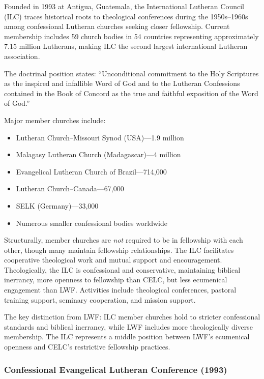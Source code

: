 Founded in 1993 at Antigua, Guatemala, the International Lutheran Council (ILC) traces historical roots to theological conferences during the 1950s--1960s among confessional Lutheran churches seeking closer fellowship. Current membership includes 59 church bodies in 54 countries representing approximately 7.15 million Lutherans, making ILC the second largest international Lutheran association.

The doctrinal position states: ``Unconditional commitment to the Holy Scriptures as the inspired and infallible Word of God and to the Lutheran Confessions contained in the Book of Concord as the true and faithful exposition of the Word of God.''

Major member churches include:

\begin{itemize}
\item Lutheran Church--Missouri Synod (USA)---1.9 million
\item Malagasy Lutheran Church (Madagascar)---4 million
\item Evangelical Lutheran Church of Brazil---714,000
\item Lutheran Church--Canada---67,000
\item SELK (Germany)---33,000
\item Numerous smaller confessional bodies worldwide
\end{itemize}

Structurally, member churches are \textit{not} required to be in fellowship with each other, though many maintain fellowship relationships. The ILC facilitates cooperative theological work and mutual support and encouragement. Theologically, the ILC is confessional and conservative, maintaining biblical inerrancy, more openness to fellowship than CELC, but less ecumenical engagement than LWF. Activities include theological conferences, pastoral training support, seminary cooperation, and mission support.

The key distinction from LWF: ILC member churches hold to stricter confessional standards and biblical inerrancy, while LWF includes more theologically diverse membership. The ILC represents a middle position between LWF's ecumenical openness and CELC's restrictive fellowship practices.

\subsubsection{Confessional Evangelical Lutheran Conference (1993)}

